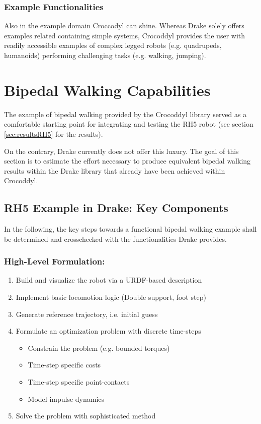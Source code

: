\subsubsection{Example Functionalities}
Also in the example domain Croccodyl can shine. Whereas Drake  solely offers examples related containing simple systems, Crocoddyl provides the user with readily accessible examples of complex legged robots (e.g. quadrupeds, humanoids) performing challenging tasks (e.g. walking, jumping).


\section{Bipedal Walking Capabilities}\label{sec:BipedWalkCapabilities}
The example of bipedal walking provided by the Crocoddyl library served as a comfortable starting point for integrating and testing the RH5  robot (see section \ref{sec:resultsRH5} for the results).

On the contrary, Drake currently does not offer this luxury. The goal of this section is to estimate the effort necessary to produce equivalent bipedal walking results within the Drake library that already have been achieved within Crocoddyl.


\subsection{RH5 Example in Drake: Key Components}
In the following, the key steps towards a functional bipedal walking example shall be determined and crosschecked with the functionalities Drake provides. 

\subsubsection{High-Level Formulation:}
\begin{enumerate}
\item Build and visualize the robot via a URDF-based description
\item Implement basic locomotion logic (Double support, foot step)
\item Generate reference trajectory, i.e. initial guess
\item Formulate an optimization problem with discrete time-steps
\begin{itemize}
\item Constrain the problem (e.g. bounded torques) 
\item Time-step specific costs 
\item Time-step specific point-contacts 
\item Model impulse dynamics
\end{itemize}
\item Solve the problem with sophisticated method
\end{enumerate}
